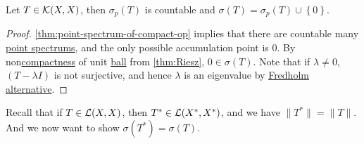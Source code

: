 \begin{proposition}
	Let \(T\in \mathcal{\MakeUppercase{k}} (X, X)\), then \(\sigma _p(T)\) is countable and \(\sigma (T) = \sigma _p(T) \cup \left\{ 0 \right\} \).
\end{proposition}
\begin{proof}
	\autoref{thm:point-spectrum-of-compact-op} implies that there are countable many \hyperref[def:point-spectrum]{point spectrums}, and the only possible accumulation point is \(0\). By non\hyperref[def:compact]{compactness} of unit \hyperref[def:ball]{ball} from \autoref{thm:Riesz}, \(0\in \sigma (T)\). Note that if \(\lambda \neq 0\), \((T - \lambda I)\) is not surjective, and hence \(\lambda \) is an eigenvalue by \hyperref[thm:Fredholm-alternative]{Fredholm alternative}.
\end{proof}

Recall that if \(T\in \mathcal{\MakeUppercase{l}} (X, X)\), then \(T^{\ast} \in \mathcal{\MakeUppercase{l}} (X^{\ast} , X^{\ast} )\), and we have \(\lVert T^{\ast}  \rVert = \lVert T \rVert \). And we now want to show \(\sigma (T^{\ast} ) = \sigma (T)\).

